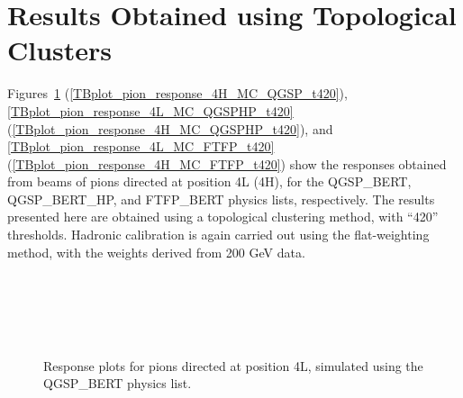 \clearpage
\section{Results Obtained using Topological Clusters}
Figures~\ref{TBplot_pion_response_4L_MC_QGSP_t420} (\ref{TBplot_pion_response_4H_MC_QGSP_t420}), \ref{TBplot_pion_response_4L_MC_QGSPHP_t420} (\ref{TBplot_pion_response_4H_MC_QGSPHP_t420}), and \ref{TBplot_pion_response_4L_MC_FTFP_t420} (\ref{TBplot_pion_response_4H_MC_FTFP_t420}) show the responses obtained from beams of pions directed at position 4L (4H), for the QGSP\_BERT, QGSP\_BERT\_HP, and FTFP\_BERT physics lists, respectively. The results presented here are obtained using a topological clustering method, with ``420'' thresholds. Hadronic calibration is again carried out using the flat-weighting method, with the weights derived from 200 GeV data.








\begin{figure}[p]
\begin{center}
\\
\\
\\
\\
\end{center}
\caption[Pions at 4L, QGSP\_BERT, topoclusters]{Response plots for pions directed at position 4L, simulated using the QGSP\_BERT physics list. }
\label{TBplot_pion_response_4L_MC_QGSP_t420}
\end{figure}

